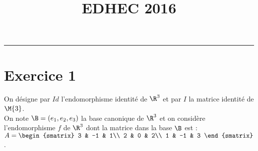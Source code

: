 \documentclass[11pt]{article}%
\title{\bf \vspace{-2cm} EDHEC 2016} %
\author{} %
\date{} %
\begin{document}
\maketitle %
\vspace{-1.4cm}\hrule %
\thispagestyle{fancy}

\vspace*{.2cm}


\section*{Exercice 1}
\noindent
On désigne par $Id$ l'endomorphisme identité de $\R^3$ et par $I$ la
matrice identité de $\M{3}$. \\
On note $\B = (e_{1},e_{2},e_{3})$ la base canonique de $\R^3$ et on
considère l'endomorphisme $f$ de $\R^3$ dont la matrice dans la base
$\B$ est : $A =
\begin{smatrix}
  3 & -1 & 1\\
  2 & 0 & 2\\
  1 & -1 & 3
\end{smatrix}
$. 
\end{document}
